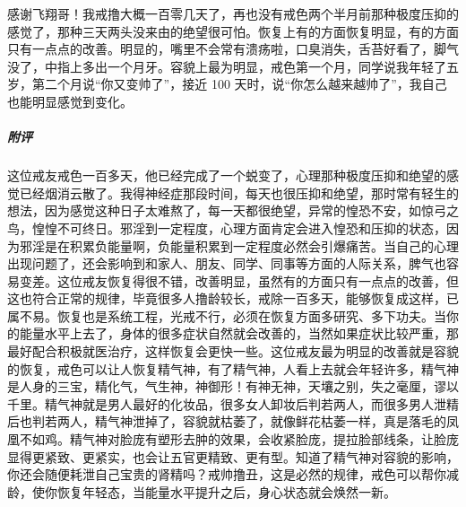 \begin{case}
    感谢飞翔哥！我戒撸大概一百零几天了，再也没有戒色两个半月前那种极度压抑的感觉了，那种三天两头没来由的绝望很可怕。恢复上有的方面恢复明显，有的方面只有一点点的改善。明显的，嘴里不会常有溃疡啦，口臭消失，舌苔好看了，脚气没了，中指上多出一个月牙。容貌上最为明显，戒色第一个月，同学说我年轻了五岁，第二个月说“你又变帅了”，接近 100 天时，说“你怎么越来越帅了”，我自己也能明显感觉到变化。
    \subparagraph{附评} 这位戒友戒色一百多天，他已经完成了一个蜕变了，心理那种极度压抑和绝望的感觉已经烟消云散了。我得神经症那段时间，每天也很压抑和绝望，那时常有轻生的想法，因为感觉这种日子太难熬了，每一天都很绝望，异常的惶恐不安，如惊弓之鸟，惶惶不可终日。邪淫到一定程度，心理方面肯定会进入惶恐和压抑的状态，因为邪淫是在积累负能量啊，负能量积累到一定程度必然会引爆痛苦。当自己的心理出现问题了，还会影响到和家人、朋友、同学、同事等方面的人际关系，脾气也容易变差。这位戒友恢复得很不错，改善明显，虽然有的方面只有一点点的改善，但这也符合正常的规律，毕竟很多人撸龄较长，戒除一百多天，能够恢复成这样，已属不易。恢复也是系统工程，光戒不行，必须在恢复方面多研究、多下功夫。当你的能量水平上去了，身体的很多症状自然就会改善的，当然如果症状比较严重，那最好配合积极就医治疗，这样恢复会更快一些。这位戒友最为明显的改善就是容貌的恢复，戒色可以让人恢复精气神，有了精气神，人看上去就会年轻许多，精气神是人身的三宝，精化气，气生神，神御形！有神无神，天壤之别，失之毫厘，谬以千里。精气神就是男人最好的化妆品，很多女人卸妆后判若两人，而很多男人泄精后也判若两人，精气神泄掉了，容貌就枯萎了，就像鲜花枯萎一样，真是落毛的凤凰不如鸡。精气神对脸庞有塑形去肿的效果，会收紧脸庞，提拉脸部线条，让脸庞显得更紧致、更紧实，也会让五官更精致、更有型。知道了精气神对容貌的影响，你还会随便耗泄自己宝贵的肾精吗？戒帅撸丑，这是必然的规律，戒色可以帮你减龄，使你恢复年轻态，当能量水平提升之后，身心状态就会焕然一新。
\end{case}

